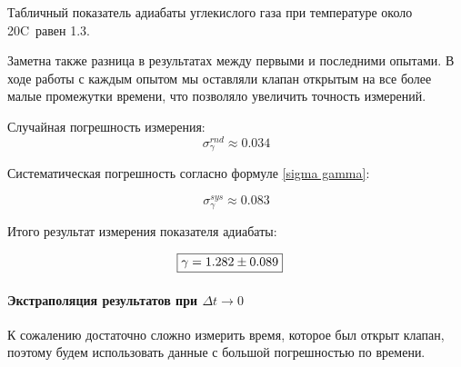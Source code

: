 \documentclass[a4paper,12pt]{report}
\begin{document}
    Табличный показатель адиабаты углекислого газа при температуре около 20C\degree \ равен 1.3. 
    
    Заметна также разница в результатах между первыми и последними опытами. В ходе работы с каждым опытом мы оставляли клапан открытым на все более малые промежутки времени, что позволяло увеличить точность измерений.

    Случайная погрешность измерения:
    \begin{equation*}
        \sigma_\gamma^{rnd}\approx0.034
    \end{equation*}

    Систематическая погрешность согласно формуле \eqref{sigma gamma}:

    \begin{equation*}
        \sigma_\gamma^{sys}\approx0.083
    \end{equation*}

    Итого результат измерения показателя адиабаты:

    \begin{align}
        \Aboxed{\gamma =& 1.282 \pm 0.089}
    \end{align}

    \paragraph*{Экстраполяция результатов при $\Delta t \rightarrow 0$}
    К сожалению достаточно сложно измерить время, которое был открыт клапан, поэтому будем использовать данные с большой погрешностью по времени. 
\end{document}
